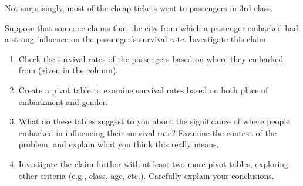 Not surprisingly, most of the cheap tickets went to passengers in 3rd class.
%

\begin{problem} %
Suppose that someone claims that the city from which a passenger embarked had a strong influence on the passenger's survival rate.
Investigate this claim.
\begin{enumerate}
    \item Check the survival rates of the passengers based on where they embarked from (given in the  column).
    \item Create a pivot table to examine survival rates based on both place of embarkment and gender.
    \item What do these tables suggest to you about the significance of where people embarked in influencing their survival rate?
    Examine the context of the problem, and explain what you think this really means.
    \item Investigate the claim further with at least two more pivot tables, exploring other criteria (e.g., class, age, etc.).
    Carefully explain your conclusions.
\end{enumerate}
\end{problem}

\newpage


